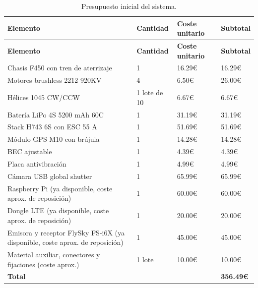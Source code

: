 \begin{longtable}{p{}p{}p{}p{}}
\caption{Presupuesto inicial del sistema.}\label{tab:presupuesto}\\
\toprule
\textbf{Elemento} & \textbf{Cantidad} & \textbf{Coste unitario} & \textbf{Subtotal} \\
\midrule
\endfirsthead
\toprule
\textbf{Elemento} & \textbf{Cantidad} & \textbf{Coste unitario} & \textbf{Subtotal} \\
\midrule
\endhead
Chasis F450 con tren de aterrizaje & 1 & 16.29€ & 16.29€ \\
Motores brushless 2212 920KV & 4 & 6.50€ & 26.00€ \\
Hélices 1045 CW/CCW & 1 lote de 10 & 6.67€ & 6.67€ \\
Batería LiPo 4S 5200 mAh 60C & 1 & 31.19€ & 31.19€ \\
Stack H743 6S con ESC 55 A & 1 & 51.69€ & 51.69€ \\
Módulo GPS M10 con brújula & 1 & 14.28€ & 14.28€ \\
BEC ajustable & 1 & 4.39€ & 4.39€ \\
Placa antivibración & 1 & 4.99€ & 4.99€ \\
Cámara USB global shutter & 1 & 65.99€ & 65.99€ \\
Raspberry Pi (ya disponible, coste aprox. de reposición) & 1 & 60.00€ & 60.00€ \\
Dongle LTE (ya disponible, coste aprox. de reposición) & 1 & 20.00€ & 20.00€ \\
Emisora y receptor FlySky FS-i6X (ya disponible, coste aprox. de reposición) & 1 & 45.00€ & 45.00€ \\
Material auxiliar, conectores y fijaciones (coste aprox.) & 1 lote & 10.00€ & 10.00€ \\
\midrule
\textbf{Total} & & & \textbf{356.49€} \\
\bottomrule
\end{longtable}

